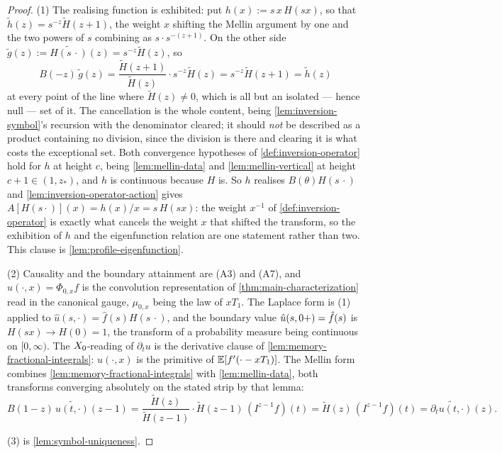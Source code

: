 \begin{proof}
\leanok
(1) The realising function is exhibited: put $h(x) := s\,x\,H(sx)$, so that
$\tilde h(z) = s^{-z}\tilde H(z+1)$, the weight $x$ shifting the Mellin argument by one and the two
powers of $s$ combining as $s\cdot s^{-(z+1)}$. On the other side
$\tilde g(z) := \widetilde{H(s\,\cdot)}(z) = s^{-z}\tilde H(z)$, so
\[
  B(-z)\,\tilde g(z)
  = \frac{\tilde H(z+1)}{\tilde H(z)}\cdot s^{-z}\tilde H(z)
  = s^{-z}\tilde H(z+1)
  = \tilde h(z)
\]
at every point of the line where $\tilde H(z) \ne 0$, which is all but an isolated --- hence null
--- set of it. The cancellation is the whole content, being \ref{lem:inversion-symbol}'s recursion
with the denominator cleared; it should \emph{not} be described as a product containing no
division, since the division is there and clearing it is what costs the exceptional set. Both
convergence hypotheses of \ref{def:inversion-operator} hold for $h$ at height $c$, being
\ref{lem:mellin-data} and \ref{lem:mellin-vertical} at height $c + 1 \in (1, z_*)$, and $h$ is
continuous because $H$ is. So $h$ realises $B(\theta)H(s\,\cdot)$ and
\ref{lem:inversion-operator-action} gives $A[H(s\cdot)](x) = h(x)/x = s\,H(sx)$: the weight
$x^{-1}$ of \ref{def:inversion-operator} is exactly what cancels the weight $x$ that shifted the
transform, so the exhibition of $h$ and the eigenfunction relation are one statement rather than
two. This clause is \ref{lem:profile-eigenfunction}.

(2) Causality and the boundary attainment are (A3) and (A7), and $u(\cdot,x) = \Phi_{0,x}f$ is
the convolution representation of \ref{thm:main-characterization} read in the canonical gauge,
$\mu_{0,x}$ being the law of $xT_1$. The Laplace form is (1) applied to
$\hat u(s, \cdot) = \hat f(s) H(s\,\cdot)$, and the boundary value $\hat u(s,0{+}) = \hat f(s)$ is
$H(sx) \to H(0) = 1$, the transform of a probability measure being continuous on $[0,\infty)$.
The $X_0$-reading of $\partial_t u$ is the derivative clause of
\ref{lem:memory-fractional-integrals}: $u(\cdot,x)$ is the primitive of $\mathbb{E}[f'(\cdot - xT_1)]$.
The Mellin form combines \ref{lem:memory-fractional-integrals} with \ref{lem:mellin-data}, both
transforms converging absolutely on the stated strip by that lemma:
\[
  B(1-z)\,\widetilde{u(t,\cdot)}(z-1)
  = \frac{\tilde H(z)}{\tilde H(z-1)}\cdot\tilde H(z-1)\,(I^{z-1}f)(t)
  = \tilde H(z)\,(I^{z-1}f)(t)
  = \widetilde{\partial_t u(t,\cdot)}(z).
\]

(3) is \ref{lem:symbol-uniqueness}.
\end{proof}

